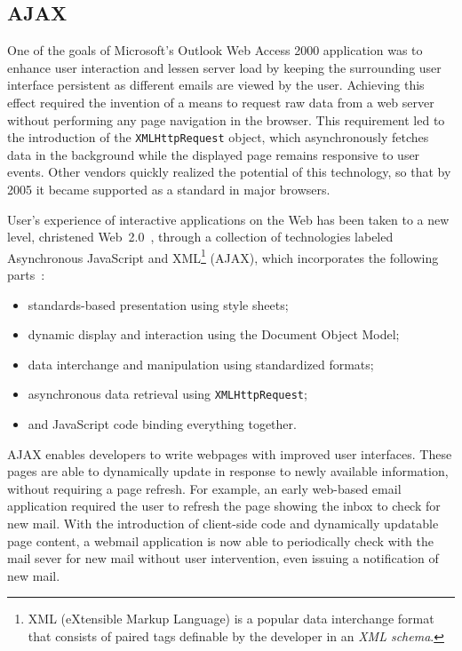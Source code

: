 \documentclass{acmtrans2m}
\begin{document}
\subsection{AJAX}
One of the goals of Microsoft's Outlook Web Access 2000 application was to enhance user interaction and lessen server load by keeping the surrounding user interface persistent as different emails are viewed by the user.
Achieving this effect required the invention of a means to request raw data from a web server without performing any page navigation in the browser.
This requirement led to the introduction of the \texttt{XMLHttpRequest} object, which asynchronously fetches data in the background while the displayed page remains responsive to user events.
Other vendors quickly realized the potential of this technology, so that by 2005 it became supported as a standard in major browsers.

User's experience of interactive applications on the Web has been taken to a new level, christened Web~2.0~\cite{web20def}, through a collection of technologies labeled Asynchronous JavaScript and XML\footnote{XML (eXtensible Markup Language) is a popular data interchange format that consists of paired tags definable by the developer in an \emph{XML schema}.} (AJAX), which incorporates the following parts~\cite{garrett05}:
\begin{itemize}
 \item standards-based presentation using style sheets;
 \item dynamic display and interaction using the Document Object Model;
 \item data interchange and manipulation using standardized formats;
 \item asynchronous data retrieval using \texttt{XMLHttpRequest};
 \item and JavaScript code binding everything together.
\end{itemize}

AJAX enables developers to write webpages with improved user interfaces.
These pages are able to dynamically update in response to newly available information, without requiring a page refresh.
For example, an early web-based email application required the user to refresh the page showing the inbox to check for new mail.
With the introduction of client-side code and dynamically updatable page content, a webmail application is now able to periodically check with the mail sever for new mail without user intervention, even issuing a notification of new mail.
\end{document}
